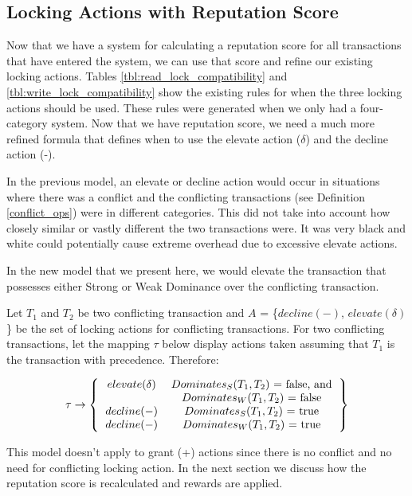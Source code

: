 \subsection{Locking Actions with Reputation Score}
\label{sec:reputation_score_locking_actions}

Now that we have a system for calculating a reputation score for all transactions that have entered the system, we can use that score and refine our existing locking actions. Tables \ref{tbl:read_lock_compatibility} and \ref{tbl:write_lock_compatibility} show the existing rules for when the three locking actions should be used. These rules were generated when we only had a four-category system. Now that we have reputation score, we need a much more refined formula that defines when to use the elevate action ($\delta$) and the decline action (-).

In the previous model, an elevate or decline action would occur in situations where there was a conflict and the conflicting transactions (see Definition \ref{conflict_ops}) were in different categories. This did not take into account how closely similar or vastly different the two transactions were. It was very black and white could potentially cause extreme overhead due to excessive elevate actions.

In the new model that we present here, we would elevate the transaction that possesses either Strong or Weak Dominance over the conflicting transaction.

Let $T_{1}$ and $T_{2}$ be two conflicting transaction and $A$ = \{$decline (-)$, $elevate (\delta)$\} be the set of locking actions for conflicting transactions. For two conflicting transactions, let the mapping $\tau$ below display actions taken assuming that $T_{1}$ is the transaction with precedence. Therefore:

\[ 
\tau \rightarrow
\left \{
  \begin{tabular}{cc}
  $elevate (\delta)$ & $Dominates_{S}(T_{1},T_{2})$ = false, and \\
   & $Dominates_{W}(T_{1},T_{2})$ = false \\
  $decline (-)$ & $Dominates_{S}(T_{1},T_{2})$ = true \\
  $decline (-)$ & $Dominates_{W}(T_{1},T_{2})$ = true \\
  \end{tabular}
\right \}
\]

This model doesn't apply to grant (+) actions since there is no conflict and no need for conflicting locking action. In the next section we discuss how the reputation score is recalculated and rewards are applied.